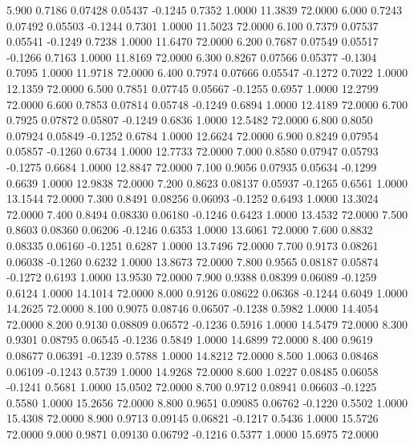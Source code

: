    5.900   0.7186   0.07428   0.05437  -0.1245   0.7352   1.0000  11.3839  72.0000
   6.000   0.7243   0.07492   0.05503  -0.1244   0.7301   1.0000  11.5023  72.0000
   6.100   0.7379   0.07537   0.05541  -0.1249   0.7238   1.0000  11.6470  72.0000
   6.200   0.7687   0.07549   0.05517  -0.1266   0.7163   1.0000  11.8169  72.0000
   6.300   0.8267   0.07566   0.05377  -0.1304   0.7095   1.0000  11.9718  72.0000
   6.400   0.7974   0.07666   0.05547  -0.1272   0.7022   1.0000  12.1359  72.0000
   6.500   0.7851   0.07745   0.05667  -0.1255   0.6957   1.0000  12.2799  72.0000
   6.600   0.7853   0.07814   0.05748  -0.1249   0.6894   1.0000  12.4189  72.0000
   6.700   0.7925   0.07872   0.05807  -0.1249   0.6836   1.0000  12.5482  72.0000
   6.800   0.8050   0.07924   0.05849  -0.1252   0.6784   1.0000  12.6624  72.0000
   6.900   0.8249   0.07954   0.05857  -0.1260   0.6734   1.0000  12.7733  72.0000
   7.000   0.8580   0.07947   0.05793  -0.1275   0.6684   1.0000  12.8847  72.0000
   7.100   0.9056   0.07935   0.05634  -0.1299   0.6639   1.0000  12.9838  72.0000
   7.200   0.8623   0.08137   0.05937  -0.1265   0.6561   1.0000  13.1544  72.0000
   7.300   0.8491   0.08256   0.06093  -0.1252   0.6493   1.0000  13.3024  72.0000
   7.400   0.8494   0.08330   0.06180  -0.1246   0.6423   1.0000  13.4532  72.0000
   7.500   0.8603   0.08360   0.06206  -0.1246   0.6353   1.0000  13.6061  72.0000
   7.600   0.8832   0.08335   0.06160  -0.1251   0.6287   1.0000  13.7496  72.0000
   7.700   0.9173   0.08261   0.06038  -0.1260   0.6232   1.0000  13.8673  72.0000
   7.800   0.9565   0.08187   0.05874  -0.1272   0.6193   1.0000  13.9530  72.0000
   7.900   0.9388   0.08399   0.06089  -0.1259   0.6124   1.0000  14.1014  72.0000
   8.000   0.9126   0.08622   0.06368  -0.1244   0.6049   1.0000  14.2625  72.0000
   8.100   0.9075   0.08746   0.06507  -0.1238   0.5982   1.0000  14.4054  72.0000
   8.200   0.9130   0.08809   0.06572  -0.1236   0.5916   1.0000  14.5479  72.0000
   8.300   0.9301   0.08795   0.06545  -0.1236   0.5849   1.0000  14.6899  72.0000
   8.400   0.9619   0.08677   0.06391  -0.1239   0.5788   1.0000  14.8212  72.0000
   8.500   1.0063   0.08468   0.06109  -0.1243   0.5739   1.0000  14.9268  72.0000
   8.600   1.0227   0.08485   0.06058  -0.1241   0.5681   1.0000  15.0502  72.0000
   8.700   0.9712   0.08941   0.06603  -0.1225   0.5580   1.0000  15.2656  72.0000
   8.800   0.9651   0.09085   0.06762  -0.1220   0.5502   1.0000  15.4308  72.0000
   8.900   0.9713   0.09145   0.06821  -0.1217   0.5436   1.0000  15.5726  72.0000
   9.000   0.9871   0.09130   0.06792  -0.1216   0.5377   1.0000  15.6975  72.0000
